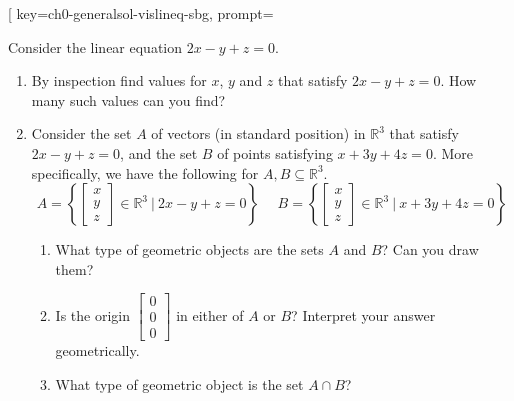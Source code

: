 



\begin{SaveQuestion}[
        key=ch0-generalsol-vislineq-sbg,
        prompt={Consider the linear equation $2x - y + z = 0$. 
        \begin{enumerate}	
        \item By inspection find values for $x$, $y$ and $z$ that satisfy $2x - y + z = 0$. How many such values can you find?
        \item Consider the set $A$ of vectors (in standard position) in $\mathbb{R}^3$ that satisfy $2x - y + z = 0$, and the set $B$ of points satisfying $x + 3y + 4 z = 0$. More specifically, we have the following for $A,B \subseteq \mathbb{R}^3$.
        $$A=\left\{\begin{bmatrix} x \\ y \\ z \end{bmatrix} \in \mathbb{R}^3 \ | \ 2x - y + z = 0\right\} \ \ \ \ \ \ B = \left\{\begin{bmatrix} x \\ y \\ z  \end{bmatrix} \in \mathbb{R}^3 \ | \ x + 3y + 4 z = 0\right\}$$
            \begin{enumerate}
            \item What type of geometric objects are the sets  $A$ and $B$? Can you draw them?
            \item Is the origin $\begin{bmatrix} 0\\0\\0 \end{bmatrix}$ in either of $A$ or $B$? Interpret your answer geometrically.
            \item What type of  geometric object  is the  set $A \cap B$?

\end{enumerate}
\end{enumerate}}
\end{SaveQuestion}
